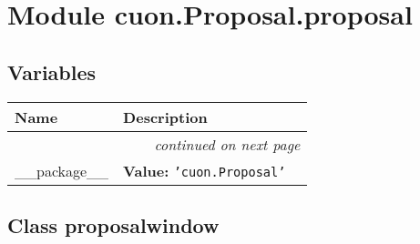 %
%
%


\section{Module cuon.Proposal.proposal}

    \label{cuon:Proposal:proposal}


  \subsection{Variables}

    \vspace{-1cm}
\hspace{\varindent}\begin{longtable}{|p{\varnamewidth}|p{\vardescrwidth}|l}
\cline{1-2}
\cline{1-2} \centering \textbf{Name} & \centering \textbf{Description}& \\
\cline{1-2}
\endhead\cline{1-2}\multicolumn{3}{r}{\small\textit{continued on next page}}\\\endfoot\cline{1-2}
\endlastfoot\raggedright \_\-\_\-p\-a\-c\-k\-a\-g\-e\-\_\-\_\- & \raggedright \textbf{Value:} 
{\tt \texttt{'}\texttt{cuon.Proposal}\texttt{'}}&\\
\cline{1-2}
\end{longtable}



\subsection{Class proposalwindow}

